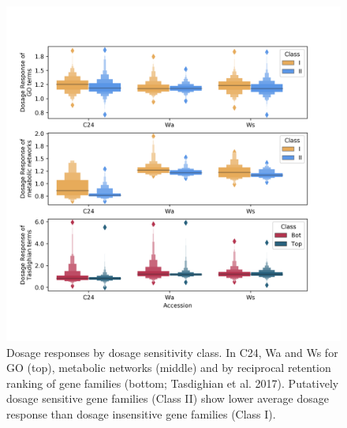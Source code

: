\documentclass[11pt]{article}
\begin{document}
{\begin{figure}[h!]
    \includegraphics[width=\linewidth]{../figures/all_dr_boxen.png}
 \caption{Dosage responses by dosage sensitivity class. In C24, Wa and Ws for GO (top), metabolic networks (middle) and by reciprocal retention ranking of gene families (bottom; Tasdighian et al. 2017). Putatively dosage sensitive gene families (Class II) show lower average dosage response than dosage insensitive gene families (Class I).}
  \label{fig4}
\end{figure}

}
\end{document}
